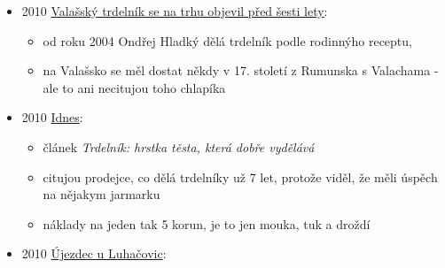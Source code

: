 \begin{itemize}
\begin{itemize}
    \begin{itemize}
    \tightlist
    \item
      Uherskoostrožsko a Veselsko
    \item
      Báleše, vdolky potřebé povidly a s mákem se jedly příležitostně,
      stejně jako malé koláčky, koblihy, mrváně, trdelníky a perníky,
      které se pekly k hodům, Vánocům, Velikonocům a o svátku sv. Ducha.
    \end{itemize}
  \item
    s. 113:

    \begin{itemize}
    \tightlist
    \item
      Uherskobrodsko a Bojkovicko
    \item
      dlouho se zde udržela tradice pečených koláčů, dortů, trdelníků,
      beránků a dalšího obřadního pečiva, která je spolu s výrobou medu
      a vosku dodnes věhlasná.
    \end{itemize}
  \end{itemize}
\item
  2010
  \href{https://zlinsky.denik.cz/podnikani/valassky-trdelnik-se-na-trhu-objevil-pred-8a2d.html}{Valašský
  trdelník se na trhu objevil před šesti lety}:

  \begin{itemize}
  \tightlist
  \item
    od roku 2004 Ondřej Hladký dělá trdelník podle rodinnýho receptu,
  \item
    na Valašsko se měl dostat někdy v 17. století z Rumunska s Valachama
    - ale to ani necitujou toho chlapíka
  \end{itemize}
\item
  2010
  \href{https://www.idnes.cz/ekonomika/domaci/trdelnik-hrstka-testa-ktera-dobre-vydelava.A101230_125615_ekonomika_spi}{Idnes}:

  \begin{itemize}
  \tightlist
  \item
    článek \emph{Trdelník: hrstka těsta, která dobře vydělává}
  \item
    citujou prodejce, co dělá trdelníky už 7 let, protože viděl, že měli
    úspěch na nějakym jarmarku
  \item
    náklady na jeden tak 5 korun, je to jen mouka, tuk a droždí
  \end{itemize}
\item
  2010
  \href{https://ceskadigitalniknihovna.cz/uuid/uuid:d23e8f20-80e9-11e7-b92d-005056827e51}{Újezdec
  u Luhačovic}:


\end{itemize}
